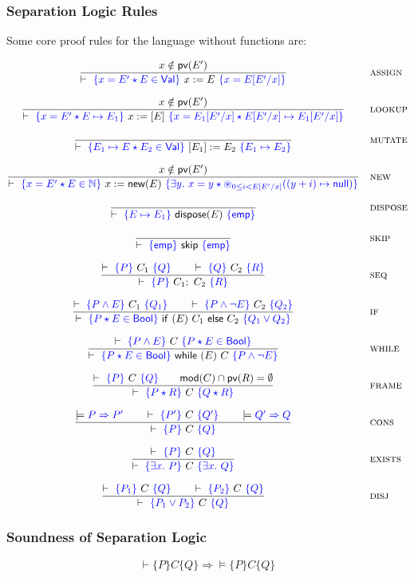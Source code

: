\documentclass[11pt]{article}
\newcommand{\Emp}{\mathsf{emp}}
\newcommand{\Val}{\mathsf{Val}}
\newcommand{\pv}{\mathsf{pv}}
\newcommand{\Mod}{\mathsf{mod}}
\newcommand{\Bool}{\mathsf{Bool}}
\newcommand{\Null}{\mathsf{null}}
\newcommand{\blueassn}[1]{\textcolor{blue}{#1}}
\newcommand{\triple}[3]{\vdash\ \blueassn{\{#1\}}\ #2\ \blueassn{\{#3\}}}
\begin{document}
\subsubsection*{Separation Logic Rules}
Some core proof rules for the language without functions are:

{\scriptsize
\[
\begin{array}{@{}c@{\quad}l@{}}
\dfrac{x \notin \pv(E')}
      {\triple{x = E' \star E \in \Val}{x := E}{x = E[E'/x]}}
& \textsc{assign} \\[4ex]

\dfrac{x \notin \pv(E')}
      {\triple{x = E' \star E \mapsto E_1}
              {x := [E]}
              {x = E_1[E'/x] \star E[E'/x] \mapsto E_1[E'/x]}}
& \textsc{lookup} \\[4ex]

\dfrac{}
      {\triple{E_1 \mapsto E \star E_2 \in \Val}
              {[E_1] := E_2}
              {E_1 \mapsto E_2}}
& \textsc{mutate} \\[4ex]

\dfrac{x \notin \pv(E')}
      {\triple{x = E' \star E \in \mathbb{N}}
              {x := \mathsf{new}(E)}
              {\exists y.\ x = y \star
               \mathop{\circledast}_{0 \le i < E[E'/x]}((y + i) \mapsto \Null)}}
& \textsc{new} \\[4ex]

\dfrac{}
      {\triple{E \mapsto E_1}{\mathsf{dispose}(E)}{\Emp}}
& \textsc{dispose} \\[4ex]

\dfrac{}
      {\triple{\Emp}{\mathsf{skip}}{\Emp}}
& \textsc{skip} \\[4ex]

\dfrac{\triple{P}{C_1}{Q} \qquad \triple{Q}{C_2}{R}}
      {\triple{P}{C_1;\ C_2}{R}}
& \textsc{seq} \\[4ex]

\dfrac{\triple{P \land E}{C_1}{Q_1}
       \qquad
       \triple{P \land \neg E}{C_2}{Q_2}}
      {\triple{P \star E \in \Bool}
              {\mathsf{if}\ (E)\ C_1\ \mathsf{else}\ C_2}
              {Q_1 \lor Q_2}}
& \textsc{if} \\[4ex]

\dfrac{\triple{P \land E}{C}{P \star E \in \Bool}}
      {\triple{P \star E \in \Bool}
              {\mathsf{while}\ (E)\ C}
              {P \land \neg E}}
& \textsc{while} \\[4ex]

\dfrac{\triple{P}{C}{Q}
       \qquad
       \Mod(C) \cap \pv(R) = \emptyset}
      {\triple{P \star R}{C}{Q \star R}}
& \textsc{frame} \\[4ex]

\dfrac{\models \blueassn{P \Rightarrow P'}
       \qquad
       \triple{P'}{C}{Q'}
       \qquad
       \models \blueassn{Q' \Rightarrow Q}}
      {\triple{P}{C}{Q}}
& \textsc{cons} \\[4ex]

\dfrac{\triple{P}{C}{Q}}
      {\triple{\exists x.\ P}{C}{\exists x.\ Q}}
& \textsc{exists} \\[4ex]

\dfrac{\triple{P_1}{C}{Q} \qquad \triple{P_2}{C}{Q}}
      {\triple{P_1 \lor P_2}{C}{Q}}
& \textsc{disj}
\end{array}
\]
}

\subsubsection*{Soundness of Separation Logic}
\[
\vdash \{P\} C \{Q\} \Rightarrow \models \{P\} C \{Q\}
\]
\end{document}
